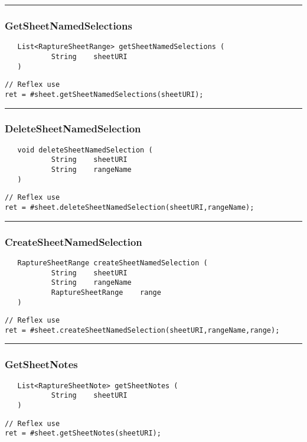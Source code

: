 \rule{15cm}{2pt}
\subsubsection{GetSheetNamedSelections}
\label{Api:GetSheetNamedSelections}
\begin{verbatim}
   List<RaptureSheetRange> getSheetNamedSelections (
           String    sheetURI
   )
\end{verbatim}
\begin{lstlisting}[language=reflex]
// Reflex use
ret = #sheet.getSheetNamedSelections(sheetURI);
\end{lstlisting}



\rule{15cm}{2pt}
\subsubsection{DeleteSheetNamedSelection}
\label{Api:DeleteSheetNamedSelection}
\begin{verbatim}
   void deleteSheetNamedSelection (
           String    sheetURI
           String    rangeName
   )
\end{verbatim}
\begin{lstlisting}[language=reflex]
// Reflex use
ret = #sheet.deleteSheetNamedSelection(sheetURI,rangeName);
\end{lstlisting}



\rule{15cm}{2pt}
\subsubsection{CreateSheetNamedSelection}
\label{Api:CreateSheetNamedSelection}
\begin{verbatim}
   RaptureSheetRange createSheetNamedSelection (
           String    sheetURI
           String    rangeName
           RaptureSheetRange    range
   )
\end{verbatim}
\begin{lstlisting}[language=reflex]
// Reflex use
ret = #sheet.createSheetNamedSelection(sheetURI,rangeName,range);
\end{lstlisting}



\rule{15cm}{2pt}
\subsubsection{GetSheetNotes}
\label{Api:GetSheetNotes}
\begin{verbatim}
   List<RaptureSheetNote> getSheetNotes (
           String    sheetURI
   )
\end{verbatim}
\begin{lstlisting}[language=reflex]
// Reflex use
ret = #sheet.getSheetNotes(sheetURI);
\end{lstlisting}



